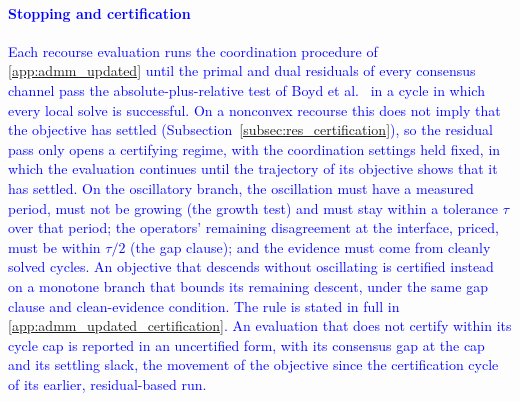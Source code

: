 \textcolor{blue}{
    \paragraph{Stopping and certification} Each recourse evaluation runs the coordination procedure of \ref{app:admm_updated} until the primal and dual residuals of every consensus channel pass the absolute-plus-relative test of Boyd et al.~\cite{boyd_admm_2011} in a cycle in which every local solve is successful. On a nonconvex recourse this does not imply that the objective has settled (Subsection~\ref{subsec:res_certification}), so the residual pass only opens a certifying regime, with the coordination settings held fixed, in which the evaluation continues until the trajectory of its objective shows that it has settled. On the oscillatory branch, the oscillation must have a measured period, must not be growing (the growth test) and must stay within a tolerance $\tau$ over that period; the operators' remaining disagreement at the interface, priced, must be within $\tau/2$ (the gap clause); and the evidence must come from cleanly solved cycles. An objective that descends without oscillating is certified instead on a monotone branch that bounds its remaining descent, under the same gap clause and clean-evidence condition. The rule is stated in full in \ref{app:admm_updated_certification}. An evaluation that does not certify within its cycle cap is reported in an uncertified form, with its consensus gap at the cap and its settling slack, the movement of the objective since the certification cycle of its earlier, residual-based run.
}

